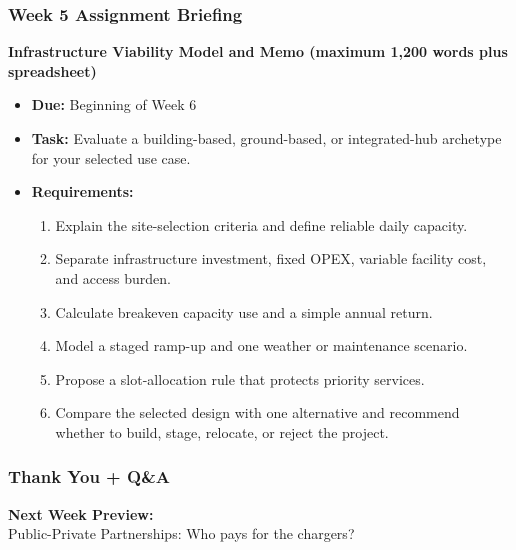 \documentclass{beamer}
\begin{document}
\begin{frame}[t]
\frametitle{Week 5 Assignment Briefing}
\textbf{Infrastructure Viability Model and Memo (maximum 1,200 words plus spreadsheet)}
\begin{itemize}
\item \textbf{Due:} Beginning of Week 6
\item \textbf{Task:} Evaluate a building-based, ground-based, or integrated-hub archetype for your selected use case.
\item \textbf{Requirements:}
\begin{enumerate}
\item Explain the site-selection criteria and define reliable daily capacity.
\item Separate infrastructure investment, fixed OPEX, variable facility cost, and access burden.
\item Calculate breakeven capacity use and a simple annual return.
\item Model a staged ramp-up and one weather or maintenance scenario.
\item Propose a slot-allocation rule that protects priority services.
\item Compare the selected design with one alternative and recommend whether to build, stage, relocate, or reject the project.
\end{enumerate}
\end{itemize}
\end{frame}

\begin{frame}[t]
  \frametitle{Thank You + Q\&A}
  
  \begin{center}
      \textbf{Next Week Preview:} \\
      \Large Public-Private Partnerships: Who pays for the chargers?
  \end{center}
\end{frame}
\end{document}

